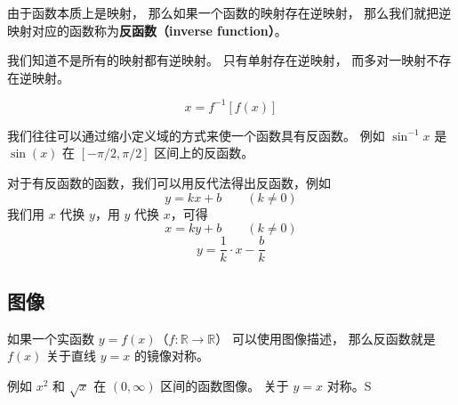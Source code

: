
\begin{issues}
\issueDraft
\end{issues}

由于函数本质上是映射， 那么如果一个函数的映射存在逆映射， 那么我们就把逆映射对应的函数称为\textbf{反函数（inverse function）}。

我们知道不是所有的映射都有逆映射。 只有单射存在逆映射， 而多对一映射不存在逆映射。

\begin{equation}
x = f^{-1}[f(x)]
\end{equation}

我们往往可以通过缩小定义域的方式来使一个函数具有反函数。 例如 $\sin^{-1} x$ 是 $\sin(x)$ 在 $[-\pi/2, \pi/2]$ 区间上的反函数。

对于有反函数的函数，我们可以用反代法得出反函数，例如
\begin{equation}
y = kx + b \qquad (k \ne 0)
\end{equation}
我们用 $x$ 代换 $y$，用 $y$ 代换 $x$，可得
\begin{equation}
x = ky + b \qquad (k \ne 0)
\end{equation}
\begin{equation}
y = \frac{1}{k} \cdot x - \frac{b}{k}
\end{equation}

\subsection{图像}
如果一个实函数 $y = f(x)$（$f: \mathbb R \to \mathbb R$） 可以使用图像描述， 那么反函数就是 $f(x)$ 关于直线 $y = x$ 的镜像对称。

例如 $x^2$ 和 $\sqrt{x}$ 在 $(0, \infty)$ 区间的函数图像。 关于 $y = x$ 对称。S